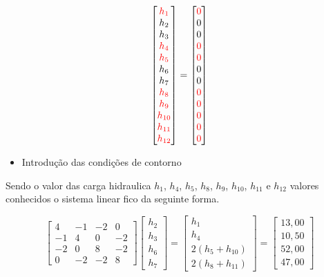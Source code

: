\documentclass{article} %
\begin{document}
\begin{equation}
\begin{bmatrix}
\color{red}h_1\\h_2\\h_3\\\color{red}h_4\\\color{red}h_5\\h_6\\h_7\\\color{red}h_8\\\color{red}h_9\\\color{red}h_{10}\\\color{red}h_{11}\\\color{red}h_{12}\\
\end{bmatrix}=\begin{bmatrix}
\color{red}0\\0\\0\\\color{red}0\\\color{red}0\\0\\0\\\color{red}0\\\color{red}0\\\color{red}0\\\color{red}0\\\color{red}0
\end{bmatrix}
\end{equation}
\begin{itemize}
	\item Introdução das condições de contorno
\end{itemize}

Sendo o valor das carga hidraulica \(h_1\), \(h_4\), \(h_5\), \(h_8\), \(h_9\), \(h_{10}\), \(h_{11}\) e \(h_{12}\) valores conhecidos o sistema linear fico da seguinte forma.


\begin{equation}
\begin{bmatrix}
4&-1&-2&0\\
-1&4&0&-2\\
-2&0&8&-2\\
0&-2&-2&8
\end{bmatrix}\begin{bmatrix}
h_2\\h_3\\h_6\\h_7
\end{bmatrix}=\begin{bmatrix}
h_1\\h_4\\2(h_5+h_{10})\\2(h_8+h_{11})
\end{bmatrix}=\begin{bmatrix}
13,00\\10,50\\52,00\\47,00
\end{bmatrix}
\end{equation}
\end{document}
